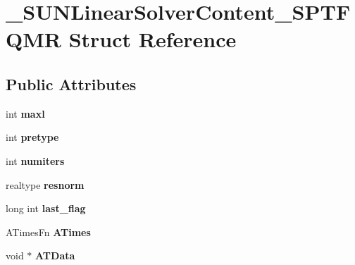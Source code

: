 \hypertarget{struct__SUNLinearSolverContent__SPTFQMR}{}\section{\+\_\+\+S\+U\+N\+Linear\+Solver\+Content\+\_\+\+S\+P\+T\+F\+Q\+MR Struct Reference}
\label{struct__SUNLinearSolverContent__SPTFQMR}
\subsection*{Public Attributes}
\begin{DoxyCompactItemize}
\item 
\mbox{\label{struct__SUNLinearSolverContent__SPTFQMR_a922a6ef99854e33cb9a8392f61e109ae}} 
int {\bfseries maxl}
\item 
\mbox{\label{struct__SUNLinearSolverContent__SPTFQMR_a3f44436db997a615c82c18af42411d2f}} 
int {\bfseries pretype}
\item 
\mbox{\label{struct__SUNLinearSolverContent__SPTFQMR_a4f936daad7200aa12eeb6e8e1ea4d5f0}} 
int {\bfseries numiters}
\item 
\mbox{\label{struct__SUNLinearSolverContent__SPTFQMR_a438466d2ca80ab9417ca8f4bd9a54420}} 
realtype {\bfseries resnorm}
\item 
\mbox{\label{struct__SUNLinearSolverContent__SPTFQMR_a0b5576eede3381473b4a7baa037d9472}} 
long int {\bfseries last\+\_\+flag}
\item 
\mbox{\label{struct__SUNLinearSolverContent__SPTFQMR_a441d3c74133151af89bf37654a0bf208}} 
A\+Times\+Fn {\bfseries A\+Times}
\item 
\mbox{\label{struct__SUNLinearSolverContent__SPTFQMR_a434e52fb610349f802d9af0b5d4e2465}} 
void $\ast$ {\bfseries A\+T\+Data}
\item 
\mbox{\label{struct__SUNLinearSolverContent__SPTFQMR_aad59baf83771389e6179686fbfff76ba}} 

\end{DoxyCompactItemize}
